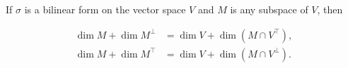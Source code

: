 If $\sigma$ is a bilinear form on the vector space $V$ and $M$ is any subspace of $V$, then

\begin{align}
\dim M + \dim M^{\perp} &= \dim V + \dim(M \cap V^{\top}),\\
\dim M + \dim M^{\top} &= \dim V + \dim(M \cap V^{\perp}).
\end{align}
